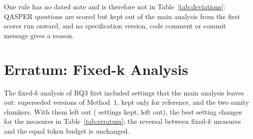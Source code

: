One rule has no dated note and is therefore not in
Table~\ref{tab:deviations}: QASPER questions are scored but kept out of
the main analysis from the first scorer run onward, and no
specification version, code comment or commit message gives a reason.

\FloatBarrier
\section{Erratum: Fixed-k Analysis}
\label{app:erratum}

The fixed-$k$ analysis of RQ3 first included settings that the main
analysis leaves out: superseded versions of Method~1, kept only for
reference, and the two sanity chunkers. With them left out
(\RQthreeSettingsKept{} settings kept, \RQthreeSettingsLeftOut{} left
out), the best setting changes for the measures in
Table~\ref{tab:erratum}; the reversal between fixed-$k$ measures and the
equal token budget is unchanged.

\begin{table}[!htb]
\centering
{}
\caption{Fixed-$k$ erratum: best setting (mean score) as first reported and after leaving out superseded and sanity
settings; only measures whose best setting changes.}
\label{tab:erratum}
\end{table}
\FloatBarrier
